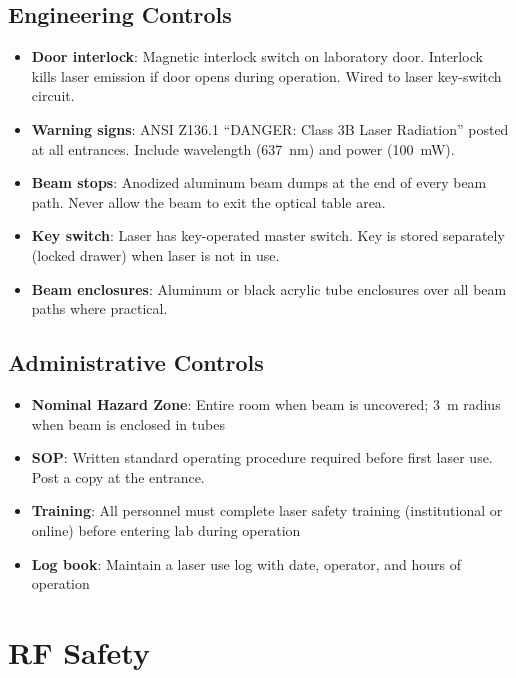 \documentclass[11pt,a4paper,openany]{book}
\begin{document}
\subsection{Engineering Controls}

\begin{itemize}[nosep]
  \item \textbf{Door interlock}: Magnetic interlock switch on laboratory door. Interlock kills laser emission if door opens during operation. Wired to laser key-switch circuit.
  \item \textbf{Warning signs}: ANSI Z136.1 ``DANGER: Class 3B Laser Radiation'' posted at all entrances. Include wavelength (637~nm) and power (100~mW).
  \item \textbf{Beam stops}: Anodized aluminum beam dumps at the end of every beam path. Never allow the beam to exit the optical table area.
  \item \textbf{Key switch}: Laser has key-operated master switch. Key is stored separately (locked drawer) when laser is not in use.
  \item \textbf{Beam enclosures}: Aluminum or black acrylic tube enclosures over all beam paths where practical.
\end{itemize}

\subsection{Administrative Controls}

\begin{itemize}[nosep]
  \item \textbf{Nominal Hazard Zone}: Entire room when beam is uncovered; 3~m radius when beam is enclosed in tubes
  \item \textbf{SOP}: Written standard operating procedure required before first laser use. Post a copy at the entrance.
  \item \textbf{Training}: All personnel must complete laser safety training (institutional or online) before entering lab during operation
  \item \textbf{Log book}: Maintain a laser use log with date, operator, and hours of operation
\end{itemize}

\section{RF Safety}
\end{document}
